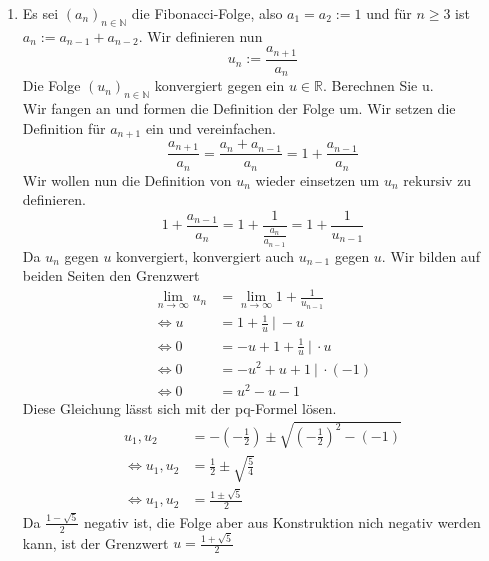 \documentclass[11pt]{article}
\begin{document}
\begin{enumerate}[ label= (\roman*) ]
        \item Es sei \( {(a_n)}_{n \in \mathbb{N} } \) die Fibonacci-Folge, also \( a_1 = a_2 := 1 \) und für \( n \geq 3 \) ist \(a_n := a_{n-1} + a_{n-2} \).
        Wir definieren nun
        \[ u_n := \frac{ a_{n+1} }{ a_n } \]
        Die Folge \( {(u_n)}_{ n \in \mathbb{N} } \) konvergiert gegen ein \( u \in \mathbb{R} \). Berechnen Sie u. \\
        Wir fangen an und formen die Definition der Folge um. Wir setzen die Definition für \(a_{n+1}\) ein und vereinfachen.
        \[ \frac{ a_{n+1} }{ a_n } = \frac{ a_n + a_{n-1} }{ a_n } = 1 + \frac{ a_{n-1} }{ a_n } \]
        Wir wollen nun die Definition von \(u_n\) wieder einsetzen um \(u_n\) rekursiv zu definieren.
        \[1 + \frac{ a_{n-1} }{ a_n } = 1 + \frac{1}{ \frac{ a_n }{ a_{n-1} } } = 1 + \frac{1}{ u_{n-1} } \]
        Da \(u_n\) gegen \(u\) konvergiert, konvergiert auch \(u_{n-1}\) gegen \(u\). Wir bilden auf beiden Seiten den Grenzwert
        \begin{align*}
            \lim_{n \to \infty} u_n &= \lim_{n \to \infty} 1 + \frac{1}{u_{n-1}} \\
            \Leftrightarrow u &= 1 + \frac{1}{u} \: | \: -u \\
            \Leftrightarrow 0 &= -u + 1 + \frac{1}{u} \: | \: \cdot u \\
            \Leftrightarrow 0 &= -u^2 + u + 1 \: | \: \cdot (-1) \\
            \Leftrightarrow 0 &= u^2 - u - 1
        \end{align*}
        Diese Gleichung lässt sich mit der pq-Formel lösen.
        \begin{align*}
             u_1, u_2 &= - \left( -\frac{1}{2} \right) \pm \sqrt{ {\left( -\frac{1}{2} \right)}^2 - (-1) } \\
             \Leftrightarrow u_1, u_2 &= \frac{1}{2} \pm \sqrt{ \frac{5}{4} } \\
             \Leftrightarrow u_1, u_2 &= \frac{ 1 \pm \sqrt{5} }{2} 
        \end{align*}
        Da \( \frac{ 1 - \sqrt{5} }{2} \) negativ ist, die Folge aber aus Konstruktion nich negativ werden kann,
        ist der Grenzwert \( u = \frac{ 1 + \sqrt{5} }{2} \)

    \end{enumerate}
    
\end{document}
